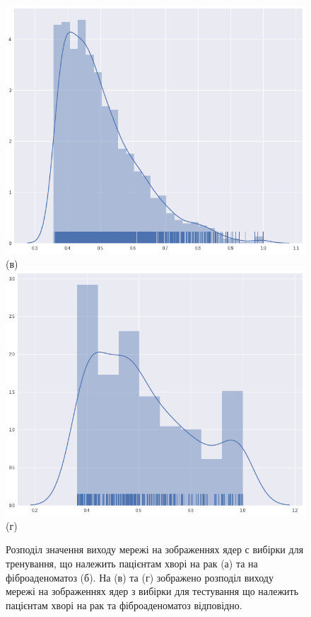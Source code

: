 \begin{figure}[t!]
	\includegraphics[width=0.95\linewidth]{Figures/Chapter4/test_dist_cancer.png}\\
	(в)
	\endminipage\hfill
	\centering	
	\includegraphics[width=0.95\linewidth]{Figures/Chapter4/test_dist_fibro.png}\\
	(г)
	\endminipage\hfill
	
	\caption{Розподіл значення виходу мережі на зображеннях ядер с вибірки для тренування, що належить пацієнтам хворі на рак (а) та на фіброаденоматоз (б). На (в) та (г) зображено розподіл виходу мережі на зображеннях ядер з вибірки для тестування що належить пацієнтам хворі на рак та фіброаденоматоз відповідно.}
	\label{fig:train_distribution}
\end{figure}

